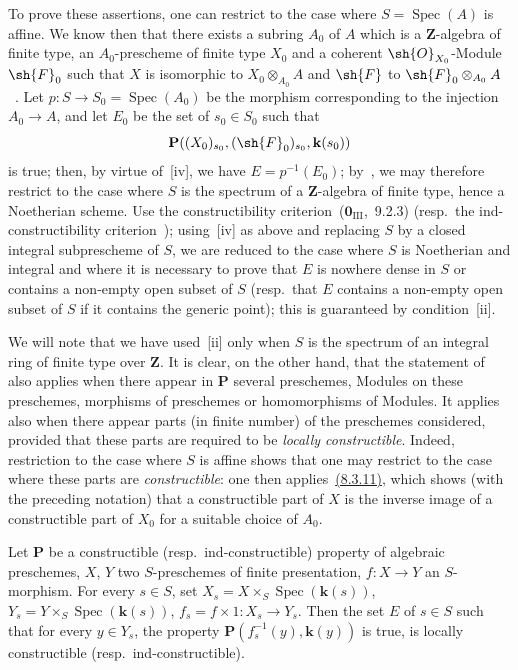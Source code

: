 To prove these assertions, one can restrict to the case where $S=\operatorname{Spec}(A)$ is affine.
We know then that there exists a subring $A_0$ of $A$ which is a $\mathbf{Z}$-algebra of finite type, an $A_0$-prescheme of finite type $X_0$ and a coherent $\sh{O}_{X_0}$-Module $\sh{F}_0$ such that $X$ is isomorphic to $X_0\otimes_{A_0}A$ and $\sh{F}$ to $\sh{F}_0\otimes_{A_0}A$~.
Let $p:S\to S_0=\operatorname{Spec}(A_0)$ be the morphism corresponding to the injection $A_0\to A$, and let $E_0$ be the set of $s_0\in S_0$ such that
\[
  \mathbf{P}((X_0)_{s_0},(\sh{F}_0)_{s_0},\mathbf{k}(s_0))
\]
is true; then, by virtue of~[iv], we have $E=p^{-1}(E_0)$; by~, we may therefore restrict to the case where $S$ is the spectrum of a $\mathbf{Z}$-algebra of finite type, hence a Noetherian scheme.
Use the constructibility criterion~($\mathbf{0}_{\mathrm{III}}$,~9.2.3) (resp.\ the ind-constructibility criterion~); using~[iv] as above and replacing $S$ by a closed integral subprescheme of $S$, we are reduced to the case where $S$ is Noetherian and integral and where it is necessary to prove that $E$ is nowhere dense in $S$ or contains a non-empty open subset of $S$ (resp.\ that $E$ contains a non-empty open subset of $S$ if it contains the generic point); this is guaranteed by condition~[ii].

We will note that we have used~[ii] only when $S$ is the spectrum of an integral ring of finite type over $\mathbf{Z}$.
It is clear, on the other hand, that the statement of~ also applies when there appear in $\mathbf{P}$ several preschemes, Modules on these preschemes, morphisms of preschemes or homomorphisms of Modules.
It applies also when there appear parts (in finite number) of the preschemes considered, provided that these parts are required to be \emph{locally constructible}.
Indeed, restriction to the case where $S$ is affine shows that one may restrict to the case where these parts are \emph{constructible}: one then applies~{\hyperlink{ega4.c04.thm.8-3-11}{(8.3.11)}}, which shows (with the preceding notation) that a constructible part of $X$ is the inverse image of a constructible part of $X_0$ for a suitable choice of $A_0$.

\begin{corollary}[9.2.4]
\label{IV.9.2.4}
Let $\mathbf{P}$ be a constructible \textnormal{(}resp.\ ind-constructible\textnormal{)} property of algebraic preschemes, $X$, $Y$ two $S$-preschemes of finite presentation, $f:X\to Y$ an $S$-morphism.
For every $s\in S$, set $X_s=X\times_S\operatorname{Spec}(\mathbf{k}(s))$, $Y_s=Y\times_S\operatorname{Spec}(\mathbf{k}(s))$, $f_s=f\times 1:X_s\to Y_s$.
Then the set $E$ of $s\in S$ such that for every $y\in Y_s$, the property $\mathbf{P}(f_s^{-1}(y),\mathbf{k}(y))$ is true, is locally constructible \textnormal{(}resp.\ ind-constructible\textnormal{)}.
\end{corollary}

